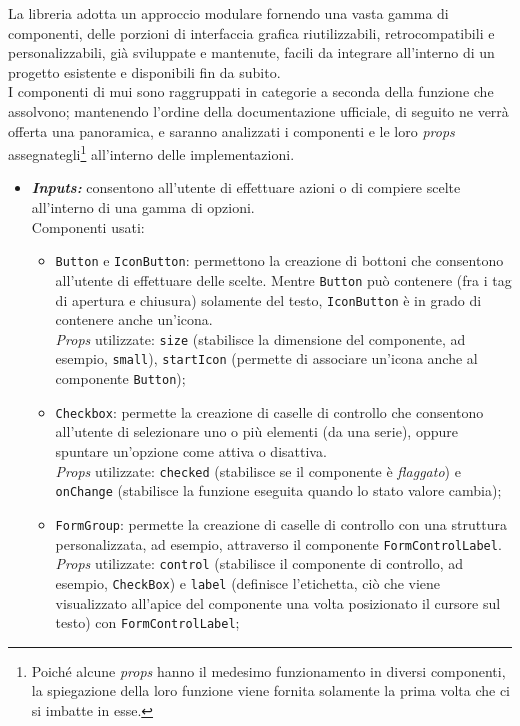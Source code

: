 La libreria adotta un approccio modulare fornendo una vasta gamma di componenti, delle porzioni di interfaccia grafica riutilizzabili, retrocompatibili e personalizzabili, già sviluppate e mantenute, facili da integrare all'interno di un progetto esistente e disponibili fin da subito.\\
I componenti di \acrshort{mui} sono raggruppati in categorie a seconda della funzione che assolvono; mantenendo l'ordine della documentazione ufficiale, di seguito ne verrà offerta una panoramica, e saranno analizzati i componenti e le loro \textit{props} assegnategli\footnote{Poiché alcune \textit{props} hanno il medesimo funzionamento in diversi componenti, la spiegazione della loro funzione viene fornita solamente la prima volta che ci si imbatte in esse.} all'interno delle implementazioni.
\begin{itemize}
  \item \textbf{\textit{Inputs:}} consentono all'utente di effettuare azioni o di compiere scelte all'interno di una gamma di opzioni.\\
  Componenti usati:  
    \begin{itemize}
      
      \item \texttt{Button} e \texttt{IconButton}: permettono la creazione di bottoni che consentono all'utente di effettuare delle scelte. Mentre \texttt{Button} può contenere (fra i tag di apertura e chiusura) solamente del testo, \texttt{IconButton} è in grado di contenere anche un'icona.\\
      \textit{Props} utilizzate: \texttt{size} (stabilisce la dimensione del componente, ad esempio, \texttt{small}), \texttt{startIcon} (permette di associare un'icona anche al componente \texttt{Button});

      \item \texttt{Checkbox}: permette la creazione di caselle di controllo che consentono all'utente di  selezionare uno o più elementi (da una serie), oppure spuntare un'opzione come attiva o disattiva.\\
      \textit{Props} utilizzate: \texttt{checked} (stabilisce se il componente è \textit{flaggato}) e \texttt{onChange} (stabilisce la funzione eseguita quando lo stato valore cambia);
      
      \item \texttt{FormGroup}: permette la creazione di caselle di controllo con una struttura personalizzata, ad esempio, attraverso il componente \texttt{FormControlLabel}.\\
      \textit{Props} utilizzate: \texttt{control} (stabilisce il componente di controllo, ad esempio, \texttt{CheckBox}) e \texttt{label} (definisce l'etichetta, ciò che viene visualizzato all'apice del componente una volta posizionato il cursore sul testo) con \texttt{FormControlLabel};
      

\end{itemize}
\end{itemize}
